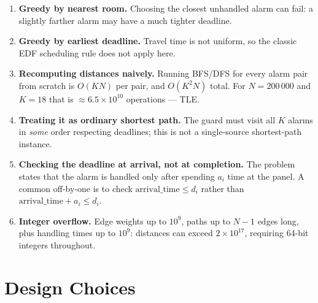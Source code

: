 \documentclass[11pt]{article}
\begin{document}
\begin{enumerate}
  \item \textbf{Greedy by nearest room.}  Choosing the closest unhandled alarm
        can fail: a slightly farther alarm may have a much tighter deadline.

  \item \textbf{Greedy by earliest deadline.}  Travel time is not uniform, so
        the classic EDF scheduling rule does not apply here.

  \item \textbf{Recomputing distances naively.}  Running BFS/DFS for every
        alarm pair from scratch is $O(KN)$ per pair, and $O(K^2 N)$ total.
        For $N=200\,000$ and $K=18$ that is $\approx 6.5\times10^{10}$
        operations --- TLE.

  \item \textbf{Treating it as ordinary shortest path.}  The guard must visit
        all $K$ alarms in \emph{some} order respecting deadlines; this is not
        a single-source shortest-path instance.

  \item \textbf{Checking the deadline at arrival, not at completion.}
        The problem states that the alarm is handled only after spending $a_i$
        time at the panel.  A common off-by-one is to check
        $\mathrm{arrival\_time}\le d_i$ rather than
        $\mathrm{arrival\_time}+a_i\le d_i$.

  \item \textbf{Integer overflow.}  Edge weights up to $10^9$, paths up to
        $N-1$ edges long, plus handling times up to $10^9$: distances can
        exceed $2\times10^{17}$, requiring 64-bit integers throughout.
\end{enumerate}

\section*{Design Choices}
\end{document}
